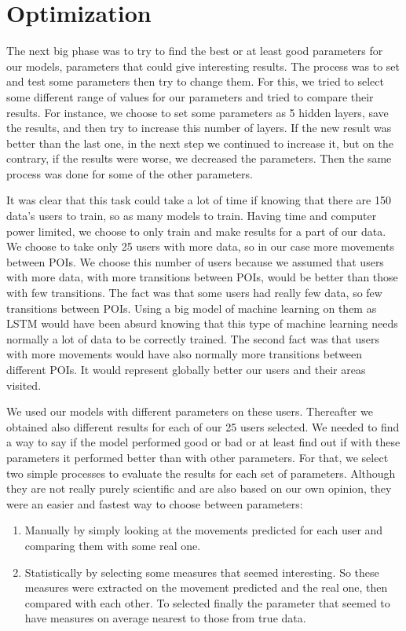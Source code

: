 \documentclass[a4]{article}
\begin{document}
\newpage
\section{Optimization}
The next big phase was to try to find the best or at least good parameters for our models, parameters that could give interesting results. The process was to set and test some parameters then try to change them. For this, we tried to select some different range of values for our parameters and tried to compare their results. For instance, we choose to set some parameters as 5 hidden layers, save the results, and then try to increase this number of layers. If the new result was better than the last one, in the next step we continued to increase it, but on the contrary, if the results were worse, we decreased the parameters. Then the same process was done for some of the other parameters. 

It was clear that this task could take a lot of time if knowing that there are 150 data's users to train, so as many models to train. Having time and computer power limited, we choose to only train and make results for a part of our data. We choose to take only 25 users with more data, so in our case more movements between POIs. We choose this number of users because we assumed that users with more data, with more transitions between POIs, would be better than those with few transitions. The fact was that some users had really few data, so few transitions between POIs. Using a big model of machine learning on them as LSTM would have been absurd knowing that this type of machine learning needs normally a lot of data to be correctly trained. The second fact was that users with more movements would have also normally more transitions between different POIs. It would represent globally better our users and their areas visited.

We used our models with different parameters on these users. Thereafter we obtained also different results for each of our 25 users selected. We needed to find a way to say if the model performed good or bad or at least find out if with these parameters it performed better than with other parameters. For that, we select two simple processes to evaluate the results for each set of parameters. Although they are not really purely scientific and are also based on our own opinion, they were an easier and fastest way to choose between parameters: 
\begin{enumerate}
\item Manually by simply looking at the movements predicted for each user and comparing them with some real one.
\item Statistically by selecting some measures that seemed interesting. So these measures were extracted on the movement predicted and the real one, then compared with each other. To selected finally the parameter that seemed to have measures on average nearest to those from true data.
\end{enumerate}
\end{document}
